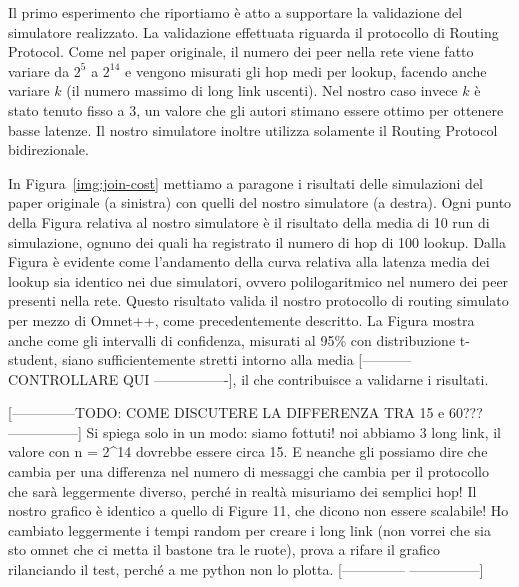 \documentclass[prodmode,acmtap]{acmlarge}
\begin{document}
Il primo esperimento che riportiamo è atto a supportare la validazione del simulatore realizzato. La validazione effettuata riguarda il protocollo di Routing Protocol. Come nel paper originale, il numero dei peer nella rete viene fatto variare da $2^5$ a $2^{14}$ e vengono misurati gli hop medi per lookup, facendo anche variare $k$ (il numero massimo di long link uscenti). Nel nostro caso invece $k$ è stato tenuto fisso a $3$, un valore che gli autori stimano essere ottimo per ottenere basse latenze. Il nostro simulatore inoltre utilizza solamente il Routing Protocol bidirezionale.

In Figura~\ref{img:join-cost} mettiamo a paragone i risultati delle simulazioni del paper originale (a sinistra) con quelli del nostro simulatore (a destra). Ogni punto della Figura relativa al nostro simulatore è il risultato della media di 10 run di simulazione, ognuno dei quali ha registrato il numero di hop di 100 lookup. Dalla Figura è evidente come l'andamento della curva relativa alla latenza media dei lookup sia identico nei due simulatori, ovvero polilogaritmico nel numero dei peer presenti nella rete. Questo risultato valida il nostro protocollo di routing simulato per mezzo di Omnet++, come precedentemente descritto. La Figura mostra anche come gli intervalli di confidenza, misurati al 95\% con distribuzione t-student, siano sufficientemente stretti intorno alla media [----------- CONTROLLARE QUI ----------------], il che contribuisce a validarne i risultati.

[--------------TODO: COME DISCUTERE LA DIFFERENZA TRA 15 e 60??? ---------------]
Si spiega solo in un modo: siamo fottuti! noi abbiamo 3 long link, il valore con n = 2^14 dovrebbe essere circa 15. E neanche gli possiamo dire che cambia per una differenza nel numero di messaggi che cambia per il protocollo che sarà leggermente diverso, perché in realtà misuriamo dei semplici hop! Il nostro grafico è identico a quello di Figure 11, che dicono non essere scalabile! Ho cambiato leggermente i tempi random per creare i long link (non vorrei che sia sto omnet che ci metta il bastone tra le ruote), prova a rifare il grafico rilanciando il test, perché a me python non lo plotta.
[-------------- ---------------]
\end{document}

